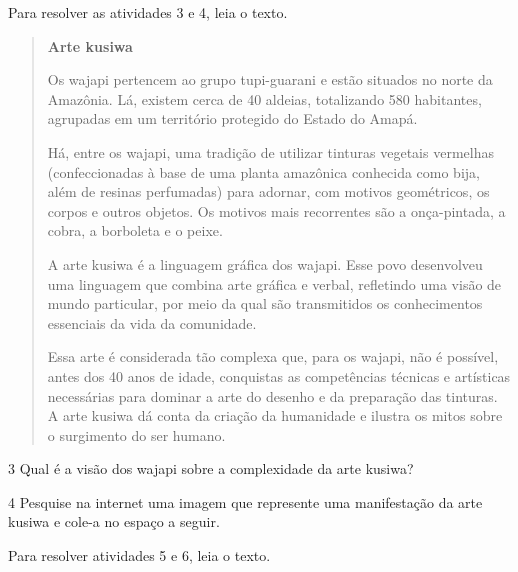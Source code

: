 \begin{escolha}
Para resolver as atividades 3 e 4, leia o texto.

\begin{quote}
\textbf{Arte kusiwa}

Os wajapi pertencem ao grupo tupi-guarani e estão situados no norte da
Amazônia. Lá, existem cerca de 40 aldeias, totalizando 580 habitantes,
agrupadas em um território protegido do Estado do Amapá.

Há, entre os wajapi, uma tradição de utilizar tinturas vegetais vermelhas
(confeccionadas à base de uma planta amazônica conhecida como bija, além
de resinas perfumadas) para adornar, com motivos geométricos, os corpos e
outros objetos. Os motivos mais recorrentes são a onça-pintada, a cobra, a
borboleta e o peixe.

A arte kusiwa é a linguagem gráfica dos wajapi. Esse povo
desenvolveu uma linguagem que combina arte gráfica e verbal, refletindo uma
visão de mundo particular, por meio da qual são transmitidos os conhecimentos
essenciais da vida da comunidade.

Essa arte é considerada tão complexa que, para os wajapi, não é possível, antes
dos 40 anos de idade, conquistas as competências técnicas e artísticas necessárias
para dominar a arte do desenho e da preparação das tinturas. A arte kusiwa dá conta
da criação da humanidade e ilustra os mitos sobre o surgimento do ser humano.

\end{quote}


\num{3}  Qual é a visão dos wajapi sobre a complexidade da arte kusiwa?



\num{4}  Pesquise na internet uma imagem que represente uma manifestação da
arte kusiwa e cole-a no espaço a seguir.




Para resolver atividades 5 e 6, leia o texto.


\end{escolha}
